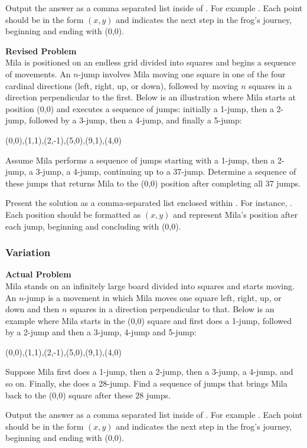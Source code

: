 Output the answer as a comma separated list inside of . For example . Each point should be in the form $(x, y)$ and indicates the next step in the frog's journey, beginning and ending with (0,0).

\textbf{Revised Problem}\\
Mila is positioned on an endless grid divided into squares and begins a sequence of movements. An $n$-jump involves Mila moving one square in one of the four cardinal directions (left, right, up, or down), followed by moving $n$ squares in a direction perpendicular to the first. Below is an illustration where Mila starts at position (0,0) and executes a sequence of jumps: initially a 1-jump, then a 2-jump, followed by a 3-jump, then a 4-jump, and finally a 5-jump:

(0,0),(1,1),(2,-1),(5,0),(9,1),(4,0)

Assume Mila performs a sequence of jumps starting with a 1-jump, then a 2-jump, a 3-jump, a 4-jump, continuing up to a 37-jump. Determine a sequence of these jumps that returns Mila to the (0,0) position after completing all 37 jumps.

Present the solution as a comma-separated list enclosed within . For instance, . Each position should be formatted as $(x, y)$ and represent Mila’s position after each jump, beginning and concluding with (0,0).

\subsubsection{Variation}
\textbf{Actual Problem}\\
Mila stands on an infinitely large board divided into squares and starts moving. An $n$-jump is a movement in which Mila moves one square left, right, up, or down and then $n$ squares in a direction perpendicular to that. Below is an example where Mila starts in the (0,0) square and first does a 1-jump, followed by a 2-jump and then a 3-jump, 4-jump and 5-jump:

(0,0),(1,1),(2,-1),(5,0),(9,1),(4,0)

Suppose Mila first does a 1-jump, then a 2-jump, then a 3-jump, a 4-jump, and so on. Finally, she does a 28-jump. Find a sequence of jumps that brings Mila back to the (0,0) square after these $28$ jumps.

Output the answer as a comma separated list inside of . For example . Each point should be in the form $(x, y)$ and indicates the next step in the frog's journey, beginning and ending with (0,0).

